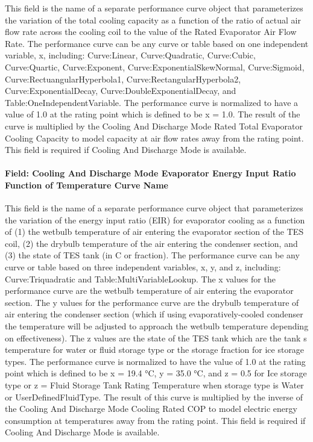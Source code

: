 This field is the name of a separate performance curve object that parameterizes the variation of the total cooling capacity as a function of the ratio of actual air flow rate across the cooling coil to the value of the Rated Evaporator Air Flow Rate. The performance curve can be any curve or table based on one independent variable, x, including: Curve:Linear, Curve:Quadratic, Curve:Cubic, Curve:Quartic, Curve:Exponent, Curve:ExponentialSkewNormal, Curve:Sigmoid, Curve:RectuangularHyperbola1, Curve:RectangularHyperbola2, Curve:ExponentialDecay, Curve:DoubleExponentialDecay, and Table:OneIndependentVariable. The performance curve is normalized to have a value of 1.0 at the rating point which is defined to be x = 1.0. The result of the curve is multiplied by the Cooling And Discharge Mode Rated Total Evaporator Cooling Capacity to model capacity at air flow rates away from the rating point. This field is required if Cooling And Discharge Mode is available.

\paragraph{Field: Cooling And Discharge Mode Evaporator Energy Input Ratio Function of Temperature Curve Name}\label{field-cooling-and-discharge-mode-evaporator-energy-input-ratio-function-of-temperature-curve-name}

This field is the name of a separate performance curve object that parameterizes the variation of the energy input ratio (EIR) for evaporator cooling as a function of (1) the wetbulb temperature of air entering the evaporator section of the TES coil, (2) the drybulb temperature of the air entering the condenser section, and (3) the state of TES tank (in C or fraction). The performance curve can be any curve or table based on three independent variables, x, y, and z, including: Curve:Triquadratic and Table:MultiVariableLookup. The x values for the performance curve are the wetbulb temperature of air entering the evaporator section. The y values for the performance curve are the drybulb temperature of air entering the condenser section (which if using evaporatively-cooled condenser the temperature will be adjusted to approach the wetbulb temperature depending on effectiveness). The z values are the state of the TES tank which are the tank s temperature for water or fluid storage type or the storage fraction for ice storage types. The performance curve is normalized to have the value of 1.0 at the rating point which is defined to be x = 19.4 °C, y = 35.0 °C, and z = 0.5 for Ice storage type or z = Fluid Storage Tank Rating Temperature when storage type is Water or UserDefinedFluidType. The result of this curve is multiplied by the inverse of the Cooling And Discharge Mode Cooling Rated COP to model electric energy consumption at temperatures away from the rating point. This field is required if Cooling And Discharge Mode is available.

